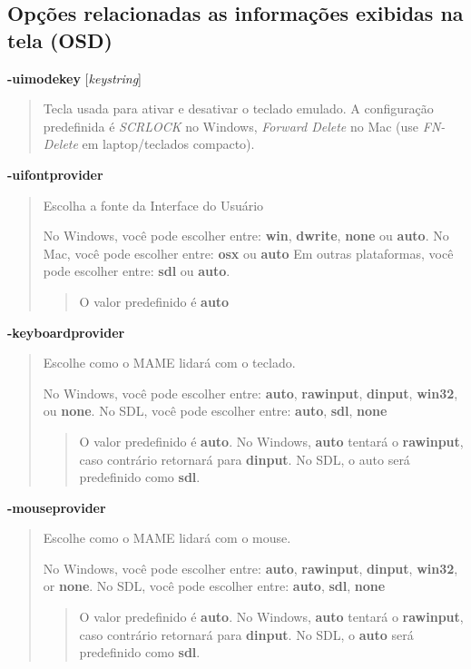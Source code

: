 \documentclass[letterpaper,10pt,brazil]{sphinxmanual}
\begin{document}
\subsection{Opções relacionadas as informações exibidas na tela (OSD)}
\label{commandline/commandline-all:osd-commandline-options}\label{commandline/commandline-all:opcoes-relacionadas-as-informacoes-exibidas-na-tela-osd}\label{commandline/commandline-all:mame-commandline-uimodekey}
\textbf{-uimodekey} {[}\emph{keystring}{]}
\begin{quote}

Tecla usada para ativar e desativar o teclado emulado.
A configuração predefinida é \emph{SCRLOCK} no Windows, \emph{Forward Delete}
no Mac (use \emph{FN-Delete} em laptop/teclados compacto).
\end{quote}
\label{commandline/commandline-all:mame-commandline-uifontprovider}
\textbf{-uifontprovider}
\begin{quote}

Escolha a fonte da Interface do Usuário

No Windows, você pode escolher entre: \textbf{win}, \textbf{dwrite}, \textbf{none}
ou \textbf{auto}.
No Mac, você pode escolher entre: \textbf{osx} ou \textbf{auto}
Em outras plataformas, você pode escolher entre: \textbf{sdl} ou
\textbf{auto}.
\begin{quote}

O valor predefinido é \textbf{auto}
\end{quote}
\end{quote}
\label{commandline/commandline-all:mame-commandline-keyboardprovider}
\textbf{-keyboardprovider}
\begin{quote}

Escolhe como o MAME lidará com o teclado.

No Windows, você pode escolher entre: \textbf{auto}, \textbf{rawinput},
\textbf{dinput}, \textbf{win32}, ou \textbf{none}.
No SDL, você pode escolher entre: \textbf{auto}, \textbf{sdl}, \textbf{none}
\begin{quote}

O valor predefinido é \textbf{auto}.
No Windows, \textbf{auto} tentará o \textbf{rawinput}, caso contrário
retornará para \textbf{dinput}. No SDL, o auto será predefinido como
\textbf{sdl}.
\end{quote}
\end{quote}
\label{commandline/commandline-all:mame-commandline-mouseprovider}
\textbf{-mouseprovider}
\begin{quote}

Escolhe como o MAME lidará com o mouse.

No Windows, você pode escolher entre: \textbf{auto}, \textbf{rawinput},
\textbf{dinput}, \textbf{win32}, or \textbf{none}.
No SDL, você pode escolher entre: \textbf{auto}, \textbf{sdl}, \textbf{none}
\begin{quote}

O valor predefinido é \textbf{auto}.
No Windows, \textbf{auto} tentará o \textbf{rawinput}, caso contrário
retornará para \textbf{dinput}. No SDL, o \textbf{auto} será predefinido
como \textbf{sdl}.
\end{quote}
\end{quote}
\end{document}
